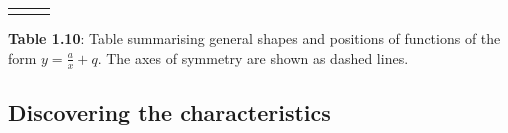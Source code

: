 \begin{center}
\begin{xtabular*}{\mytablewidth}[t]{|p{10\mystarwidth}|p{10\mystarwidth}|p{10\mystarwidth}|}
\begin{center}
\vspace{2pt}
\vspace{.1in}
\end{center}    
\tabularnewline{}
\end{xtabular*}
\end{center}
\begin{center}{\small\bfseries Table 1.10}: Table summarising general shapes and positions of functions of the form $y=\frac{a}{x}+q$. The axes of symmetry are shown as dashed lines.\end{center}
\par
\subsection*{Discovering the characteristics}  
